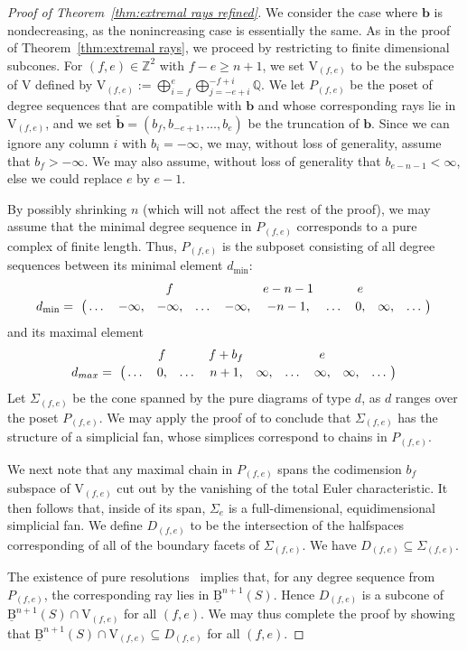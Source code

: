 \documentclass[12pt]{amsart}
\theoremstyle{definition}
\theoremstyle{remark}
\newcommand{\ZZ}{\mathbb{Z}}
\newcommand{\QQ}{\mathbb{Q}}
\newcommand{\VV}{\mathrm{V}}
\newcommand{\bb}{\mathbf{b}}
\newcommand{\BBQ}{\underline{\mathrm{B}}}
\begin{document}
\begin{proof}[Proof of Theorem~\ref{thm:extremal rays refined}]
We consider the case where $\bb$ is nondecreasing, as the nonincreasing case is essentially the same.  As in the proof of Theorem~\ref{thm:extremal rays}, we proceed by restricting to finite dimensional subcones.  For $(f,e)\in \ZZ^2$ with $f-e\geq n+1$, we set $\VV_{(f,e)}$ to be the subspace of $\VV$ defined by $\VV_{(f,e)}:=\bigoplus_{i=f}^e \bigoplus_{j=-e+i}^{-f+i} \QQ$.  We let $P_{(f,e)}$ be the poset of degree sequences that are compatible with $\bb$ and whose corresponding rays lie in $\VV_{(f,e)}$, and we set $\widetilde{\bb}=(b_{f},b_{-e+1},\dots, b_e)$ be the truncation of $\bb$.  Since we can ignore any column $i$ with $b_i=-\infty$, we may, without loss of generality, assume that $b_f>-\infty$.  We may also assume, without loss of generality that $b_{e-n-1}<\infty$, else we could replace $e$ by $e-1$.  

By possibly shrinking $n$ (which will not affect the rest of the proof), we may assume that the minimal degree sequence in $P_{(f,e)}$ corresponds to a pure complex of finite length.  Thus, $P_{(f,e)}$ is the subposet consisting of all degree sequences between its minimal element $d_{\min}$:
\[\bordermatrix{&&&f&&&e-n-1&&e &&\cr
              d_{\min}= &\dots&-\infty,&-\infty,&\dots&-\infty,&-n-1,&\dots &0, &\infty,&\dots\cr}\]
and its maximal element
\[\bordermatrix{&&f&&f+b_f&&&e &&\cr
              d_{max}= &\dots&0,&\dots&n+1,&\infty,&\dots &\infty,&\infty,&\dots\cr}\]
Let $\Sigma_{(f,e)}$ be the cone spanned by the pure diagrams of type $d$, as $d$ ranges over the poset $P_{(f,e)}$.  We may apply the proof of  \cite[2.9]{boij-sod1} to conclude that $\Sigma_{(f,e)}$ has the structure of a simplicial fan, whose simplices correspond to chains in $P_{(f,e)}$.

We next note that any maximal chain in $P_{(f,e)}$ spans the codimension $b_f$ subspace of $\VV_{(f,e)}$ cut out by the vanishing of the total Euler characteristic.  It then follows that, inside of its span, $\Sigma_e$ is a full-dimensional, equidimensional simplicial fan.  We define $D_{(f,e)}$ to be the intersection of the halfspaces corresponding of all of the boundary facets of $\Sigma_{(f,e)}$.  We have $D_{(f,e)}\subseteq \Sigma_{(f,e)}$.

The existence of pure resolutions~\cite[Theorem~0.1]{eis-schrey1} implies that, for any degree sequence from $P_{(f,e)}$, the corresponding ray lies in $\BBQ^{n+1}(S)$.  Hence $D_{(f,e)}$ is a subcone of $\BBQ^{n+1}(S)\cap \VV_{(f,e)}$ for all $(f,e)$.  We may thus complete the proof by showing that  $\BBQ^{n+1}(S)\cap \VV_{(f,e)} \subseteq D_{(f,e)}$ for all $(f,e)$.  


\end{proof}
\end{document}
